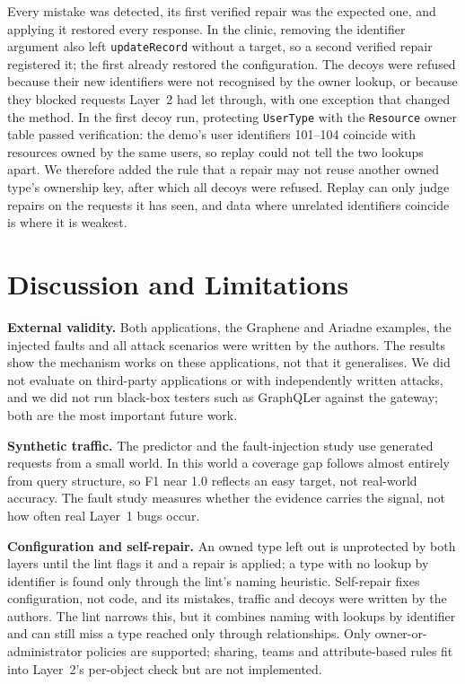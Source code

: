 \documentclass[conference]{IEEEtran}
\newcommand{\code}[1]{\texttt{\small #1}}
\begin{document}
Every mistake was detected, its first verified repair was the expected one, and applying it restored every response. In the clinic, removing the identifier argument also left \code{updateRecord} without a target, so a second verified repair registered it; the first already restored the configuration. The decoys were refused because their new identifiers were not recognised by the owner lookup, or because they blocked requests Layer~2 had let through, with one exception that changed the method. In the first decoy run, protecting \code{UserType} with the \code{Resource} owner table passed verification: the demo's user identifiers 101--104 coincide with resources owned by the same users, so replay could not tell the two lookups apart. We therefore added the rule that a repair may not reuse another owned type's ownership key, after which all decoys were refused. Replay can only judge repairs on the requests it has seen, and data where unrelated identifiers coincide is where it is weakest.

\section{Discussion and Limitations}

\textbf{External validity.} Both applications, the Graphene and Ariadne examples, the injected faults and all attack scenarios were written by the authors. The results show the mechanism works on these applications, not that it generalises. We did not evaluate on third-party applications or with independently written attacks, and we did not run black-box testers such as GraphQLer against the gateway; both are the most important future work.

\textbf{Synthetic traffic.} The predictor and the fault-injection study use generated requests from a small world. In this world a coverage gap follows almost entirely from query structure, so F1 near 1.0 reflects an easy target, not real-world accuracy. The fault study measures whether the evidence carries the signal, not how often real Layer~1 bugs occur.

\textbf{Configuration and self-repair.} An owned type left out is unprotected by both layers until the lint flags it and a repair is applied; a type with no lookup by identifier is found only through the lint's naming heuristic. Self-repair fixes configuration, not code, and its mistakes, traffic and decoys were written by the authors. The lint narrows this, but it combines naming with lookups by identifier and can still miss a type reached only through relationships. Only owner-or-administrator policies are supported; sharing, teams and attribute-based rules fit into Layer~2's per-object check but are not implemented.
\end{document}
